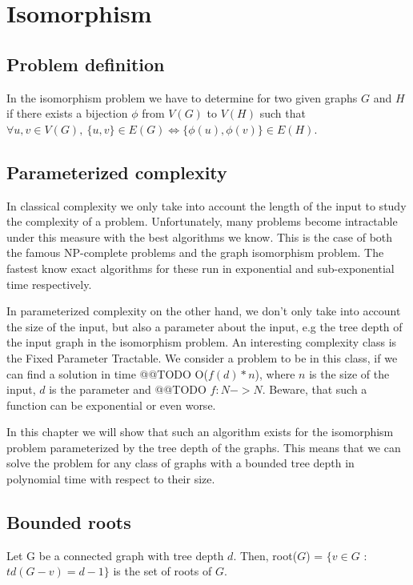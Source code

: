 \section{Isomorphism}


\subsection{Problem definition}
In the isomorphism problem we have to determine for two given graphs $G$ and $H$ if there exists a bijection $\phi$ from $V(G)$ to $V(H)$ such that $\forall u, v \in V(G), \ \{u, v\} \in E(G) \iff \{\phi(u), \phi(v)\} \in E(H)$.

\subsection{Parameterized complexity}
In classical complexity we only take into account the length of the input to study the complexity of a problem. Unfortunately, many problems become intractable under this measure with the best algorithms we know. This is the case of both the famous NP-complete problems and the graph isomorphism problem. The fastest know exact algorithms for these run in exponential and sub-exponential time respectively. 

In parameterized complexity on the other hand, we don't only take into account the size of the input, but also a parameter about the input, e.g the tree depth of the input graph in the isomorphism problem. An interesting complexity class is the Fixed Parameter Tractable. We consider a problem to be in this class, if we can find a solution in time @@TODO O($f(d) * n$), where $n$ is the size of the input, $d$ is the parameter and @@TODO $f: N -> N$. Beware, that such a function can be exponential or even worse.

In this chapter we will show that such an algorithm exists for the isomorphism problem parameterized by the tree depth of the graphs. This means that we can solve the problem for any class of graphs with a bounded tree depth in polynomial time with respect to their size.

\subsection{Bounded roots}

\begin{definition}
Let G be a connected graph with tree depth $d$. Then, root($G$) = $\{ v \in G$ : $td(G - v) = d - 1\}$ is the set of roots of $G$.
\end{definition}


